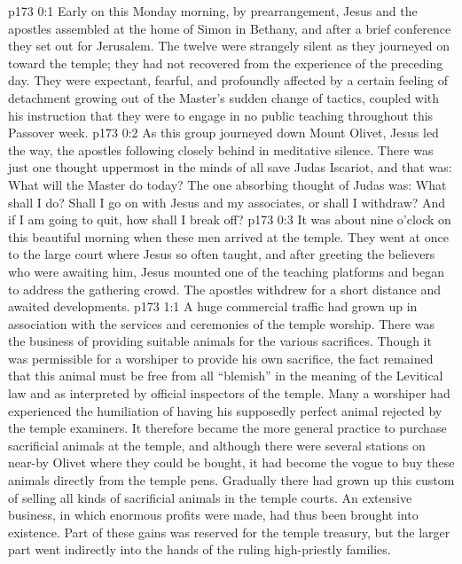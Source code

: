 \author{Midwayer Commission}
\vs p173 0:1 Early on this Monday morning, by prearrangement, Jesus and the apostles assembled at the home of Simon in Bethany, and after a brief conference they set out for Jerusalem. The twelve were strangely silent as they journeyed on toward the temple; they had not recovered from the experience of the preceding day. They were expectant, fearful, and profoundly affected by a certain feeling of detachment growing out of the Master’s sudden change of tactics, coupled with his instruction that they were to engage in no public teaching throughout this Passover week.
\vs p173 0:2 As this group journeyed down Mount Olivet, Jesus led the way, the apostles following closely behind in meditative silence. There was just one thought uppermost in the minds of all save Judas Iscariot, and that was: What will the Master do today? The one absorbing thought of Judas was: What shall I do? Shall I go on with Jesus and my associates, or shall I withdraw? And if I am going to quit, how shall I break off?
\vs p173 0:3 It was about nine o’clock on this beautiful morning when these men arrived at the temple. They went at once to the large court where Jesus so often taught, and after greeting the believers who were awaiting him, Jesus mounted one of the teaching platforms and began to address the gathering crowd. The apostles withdrew for a short distance and awaited developments.
\vs p173 1:1 A huge commercial traffic had grown up in association with the services and ceremonies of the temple worship. There was the business of providing suitable animals for the various sacrifices. Though it was permissible for a worshiper to provide his own sacrifice, the fact remained that this animal must be free from all “blemish” in the meaning of the Levitical law and as interpreted by official inspectors of the temple. Many a worshiper had experienced the humiliation of having his supposedly perfect animal rejected by the temple examiners. It therefore became the more general practice to purchase sacrificial animals at the temple, and although there were several stations on near\hyp{}by Olivet where they could be bought, it had become the vogue to buy these animals directly from the temple pens. Gradually there had grown up this custom of selling all kinds of sacrificial animals in the temple courts. An extensive business, in which enormous profits were made, had thus been brought into existence. Part of these gains was reserved for the temple treasury, but the larger part went indirectly into the hands of the ruling high\hyp{}priestly families.
